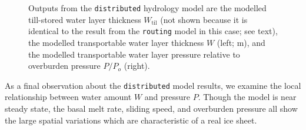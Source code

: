 \documentclass[gmd]{copernicus}   %
\newcommand{\text}{\textrm}
\newcommand{\Wtil}{W_{\text{til}}}
\begin{document}
\begin{figure}[ht]
\caption{Outputs from the \texttt{distributed} hydrology model are the modelled till-stored water layer thickness $\Wtil$ (not shown because it is identical to the result from the \texttt{routing} model in this case; see text), the modelled transportable water layer thickness $W$ (left; $\mathrm{m}$), and the modelled transportable water layer pressure relative to overburden pressure $P/P_o$ (right).}
\label{fig:Greendistributedresults}
\end{figure}

As a final observation about the \texttt{distributed} model results, we examine the local relationship between water amount $W$ and pressure $P$.  Though the model is near steady state, the basal melt rate, sliding speed, and overburden pressure all show the large spatial variations which are characteristic of a real ice sheet.
\end{document}
